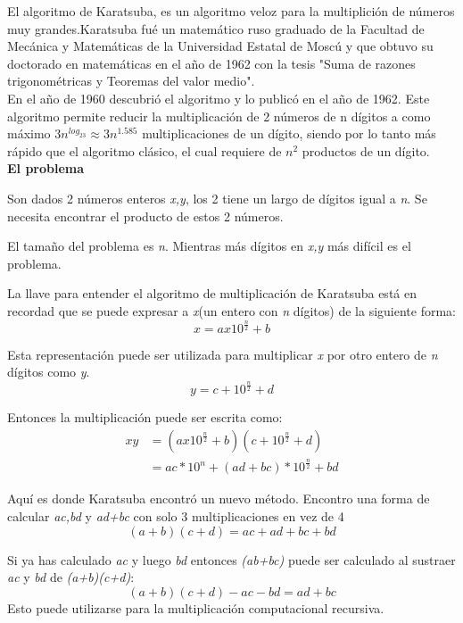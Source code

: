 El algoritmo de Karatsuba, es un algoritmo veloz para la multiplición de números muy grandes.Karatsuba fué un matemático ruso graduado de la Facultad de Mecánica y Matemáticas de la Universidad Estatal de Moscú y que obtuvo su doctorado en matemáticas en el año de 1962 con la tesis "Suma de razones trigonométricas y Teoremas del valor medio".\\

En el año de 1960 descubrió el algoritmo y lo publicó en el año de 1962. Este algoritmo permite reducir la multiplicación de 2 números de n dígitos a como máximo $3n^{log_23} \approx 3n^{1.585}$ multiplicaciones de un dígito, siendo por lo tanto más rápido que el algoritmo clásico, el cual requiere de $n^2$ productos de un dígito.\\

\textbf{El problema}

    Son dados 2 números enteros \textit{x,y}, los 2 tiene un largo de dígitos igual a \textit{n}. Se necesita encontrar el producto de estos 2 números.
    
    El tamaño del problema es \textit{n}. Mientras más dígitos en \textit{x,y} más difícil es el problema.
    
    La llave para entender el algoritmo de multiplicación de Karatsuba está en recordad que se puede expresar a \textit{x}(un entero con \textit{n} dígitos) de la siguiente forma:
    $$
        x=ax10^{\frac{n}{2}}+b
    $$
    
    Esta representación puede ser utilizada para multiplicar \textit{x} por otro entero de \textit{n} dígitos como \textit{y}.
    $$
        y=c+10^{\frac{n}{2}}+d
    $$
    
    Entonces la multiplicación puede ser escrita como:
    \begin{equation*}
        \begin{split}
             xy & =(ax10^{\frac{n}{2}}+b)(c+10^{\frac{n}{2}}+d) \\
             & =ac*10^n + (ad+bc)*10^{\frac{n}{2}}+bd
        \end{split}
    \end{equation*}
    
    Aquí es donde Karatsuba encontró un nuevo método. Encontro una forma de calcular \textit{ac,bd} y \textit{ad+bc} con solo 3 multiplicaciones en vez de 4
    $$
        (a+b)(c+d)=ac+ad+bc+bd
    $$
    
    Si ya has calculado \textit{ac} y luego \textit{bd} entonces \textit{(ab+bc)} puede ser calculado al sustraer \textit{ac} y \textit{bd} de \textit{(a+b)(c+d)}:
    $$
        (a+b)(c+d)-ac-bd=ad+bc
    $$
    Esto puede utilizarse para la multiplicación computacional recursiva.\\
    
